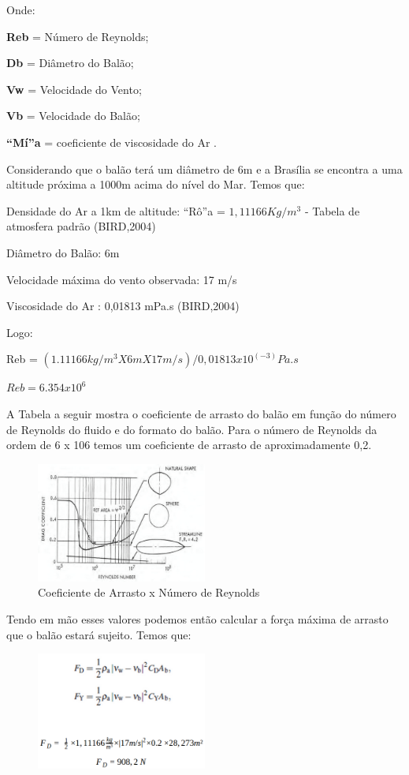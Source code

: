 	Onde:

	\textbf{Reb} = Número de Reynolds;

	\textbf{Db} = Diâmetro do Balão;

	\textbf{Vw} = Velocidade do Vento;

	\textbf{Vb} = Velocidade do Balão;

	\textbf{“Mí”a} = coeficiente de viscosidade do Ar .

	Considerando que o balão terá um diâmetro de 6m e a Brasília se encontra a uma altitude próxima a 1000m acima do nível do Mar. Temos que:

	Densidade do Ar a 1km de altitude: “Rô”a = $1,11166 Kg/m^3$ - Tabela de atmosfera padrão  (BIRD,2004)

	Diâmetro do Balão: 6m

	Velocidade máxima do vento observada: 17 m/s

	Viscosidade do Ar : 0,01813 mPa.s (BIRD,2004)

	Logo:

	Reb = $(1.11166 kg/m^3 X 6m X 17 m/s) / 0,01813 x 10^(-3) Pa.s$

	$Reb = 6.354 x 10^6$

	A Tabela a seguir mostra o coeficiente de arrasto do balão em função do número de Reynolds do fluido e do formato do balão. Para o número de Reynolds da ordem de 6 x 106  temos um coeficiente de arrasto de aproximadamente 0,2.

	\begin{figure}[H]
		\centering
		\includegraphics[width=0.5\textwidth]{figuras/coeficienteArrasto}
		\caption{Coeficiente de Arrasto x Número de Reynolds}
		\label{img:coeficienteArrasto}
	\end{figure}

	Tendo em mão esses valores podemos então calcular a força máxima de arrasto que o balão estará sujeito. Temos que:

	\begin{figure}[H]
		\centering
		\includegraphics[width=0.5\textwidth]{figuras/formulasCoeficienteArrasto}
		\caption{}
		\label{img:formulasCoeficienteArrasto}
	\end{figure}


